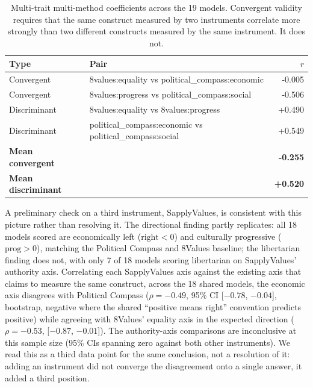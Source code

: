\documentclass[11pt]{article}
\begin{document}
\begin{table}[H]
\centering
\caption{Multi-trait multi-method coefficients across the 19 models. Convergent validity requires that the same construct measured by two instruments correlate more strongly than two different constructs measured by the same instrument. It does not.}
\label{stab:mtmm}
\begin{tabular}{llr}
\toprule
Type & Pair & $r$ \\
\midrule
Convergent & 8values:equality vs political\_compass:economic & -0.005 \\
Convergent & 8values:progress vs political\_compass:social & -0.506 \\
Discriminant & 8values:equality vs 8values:progress & +0.490 \\
Discriminant & political\_compass:economic vs political\_compass:social & +0.549 \\
\midrule
\textbf{Mean convergent} & & \textbf{-0.255} \\
\textbf{Mean discriminant} & & \textbf{+0.520} \\
\bottomrule
\end{tabular}
\end{table}

A preliminary check on a third instrument, SapplyValues, is consistent with
this picture rather than resolving it. The directional finding partly
replicates: all 18 models scored are economically left ($\text{right}<0$)
and culturally progressive ($\text{prog}>0$), matching the Political
Compass and 8Values baseline; the libertarian finding does not, with only 7
of 18 models scoring libertarian on SapplyValues' authority axis.
Correlating each SapplyValues axis against the existing axis that claims to
measure the same construct, across the 18 shared models, the economic axis
disagrees with Political Compass ($\rho=-0.49$, 95\% CI [$-0.78$, $-0.04$],
bootstrap, negative where the shared ``positive means right'' convention
predicts positive) while agreeing with 8Values' equality axis in the
expected direction ($\rho=-0.53$, [$-0.87$, $-0.01$]). The authority-axis
comparisons are inconclusive at this sample size (95\% CIs spanning zero
against both other instruments). We read this as a third data point for the
same conclusion, not a resolution of it: adding an instrument did not
converge the disagreement onto a single answer, it added a third position.
\end{document}
